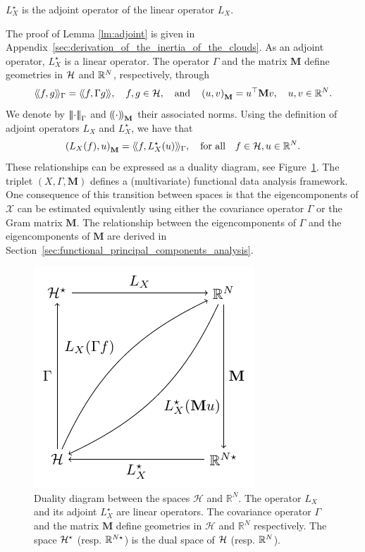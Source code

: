 \begin{lemma}\label{lm:adjoint}
    $L^\star_X$ is the adjoint operator of the linear operator $L_X$.
\end{lemma}
The proof of Lemma \ref{lm:adjoint} is given in Appendix~\ref{sec:derivation_of_the_inertia_of_the_clouds}. As an adjoint operator, $L^\star_X$ is a linear operator. The operator $\Gamma$ and the matrix $\mathbf{M}$ define geometries in $\mathcal{H}$ and $\mathbb{R}^N$, respectively, through
\begin{equation}
\langle\!\langle f, g\rangle\!\rangle_\Gamma = \langle\!\langle f, \Gamma g\rangle\!\rangle,\quad f, g \in \mathcal{H}, \quad\text{and}\quad \left(u, v\right)_{\mathbf{M}} = u^\top \mathbf{M} v,\quad u, v \in \mathbb{R}^N.
\end{equation}
We denote by $\left|\!\left|\!\left|\cdot\right|\!\right|\!\right|_\Gamma$ and $\left(\!\left(\cdot\right)\!\right)_{\mathbf{M}}$ their associated norms.
Using the definition of adjoint operators $L_X$ and $L^\star_X$, we have that
\begin{equation}
    \left(L_X(f), u\right)_{\mathbf{M}} = \langle\!\langle f, L^\star_X(u)\rangle\!\rangle_\Gamma, \quad\text{for all}\quad f \in \mathcal{H}, u \in \mathbb{R}^N.
\end{equation}
These relationships can be expressed as a duality diagram, see Figure~\ref{fig:duality_diagram}. The triplet $(X, \Gamma, \mathbf{M})$ defines a (multivariate) functional data analysis framework. One consequence of this transition between spaces is that the eigencomponents of $\mathcal{X}$ can be estimated equivalently using either the covariance operator $\Gamma$ or the Gram matrix $\mathbf{M}$. The relationship between the eigencomponents of $\Gamma$ and the eigencomponents of $\mathbf{M}$ are derived in Section~\ref{sec:functional_principal_components_analysis}.
\begin{figure}
    \centering
    \includegraphics[scale=1.2]{figures/duality_diagram}
    \caption{Duality diagram between the spaces $\mathcal{H}$ and $\mathbb{R}^N$. The operator $L_X$ and its adjoint $L^\star_X$ are linear operators. The covariance operator $\Gamma$ and the matrix $\mathbf{M}$ define geometries in $\mathcal{H}$ and $\mathbb{R}^N$ respectively. The space $\mathcal{H}^\star$ (resp. $\mathbb{R}^{N \star}$) is the dual space of $\mathcal{H}$ (resp. $\mathbb{R}^N$).}
    \label{fig:duality_diagram}
\end{figure}

